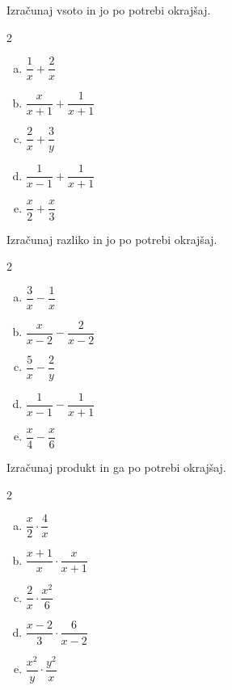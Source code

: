\documentclass[a4paper,12pt]{letter}
\begin{document}
\begin{naloga}
Izra\v{c}unaj vsoto in jo po potrebi okraj\v{s}aj.

\begin{multicols}{2}
\begin{enumerate}[a.)]
\item $\dfrac{1}{x}+\dfrac{2}{x}$
\item $\dfrac{x}{x+1}+\dfrac{1}{x+1}$
\item $\dfrac{2}{x}+\dfrac{3}{y}$
\item $\dfrac{1}{x-1}+\dfrac{1}{x+1}$
\item $\dfrac{x}{2}+\dfrac{x}{3}$
\end{enumerate}
\end{multicols}
\end{naloga}

\begin{naloga}
Izra\v{c}unaj razliko in jo po potrebi okraj\v{s}aj.

\begin{multicols}{2}
\begin{enumerate}[a.)]
\item $\dfrac{3}{x}-\dfrac{1}{x}$
\item $\dfrac{x}{x-2}-\dfrac{2}{x-2}$
\item $\dfrac{5}{x}-\dfrac{2}{y}$
\item $\dfrac{1}{x-1}-\dfrac{1}{x+1}$
\item $\dfrac{x}{4}-\dfrac{x}{6}$
\end{enumerate}
\end{multicols}
\end{naloga}

\begin{naloga}
Izra\v{c}unaj produkt in ga po potrebi okraj\v{s}aj.

\begin{multicols}{2}
\begin{enumerate}[a.)]
\item $\dfrac{x}{2}\cdot\dfrac{4}{x}$
\item $\dfrac{x+1}{x}\cdot\dfrac{x}{x+1}$
\item $\dfrac{2}{x}\cdot\dfrac{x^2}{6}$
\item $\dfrac{x-2}{3}\cdot\dfrac{6}{x-2}$
\item $\dfrac{x^2}{y}\cdot\dfrac{y^2}{x}$
\end{enumerate}
\end{multicols}
\end{naloga}
\end{document}
